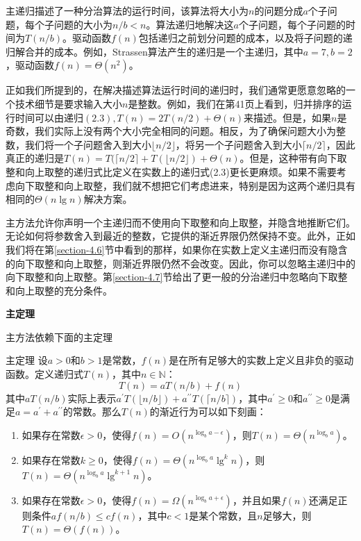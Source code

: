 \documentclass[lang=cn,newtx,10pt,scheme=chinese]{elegantbook}
\begin{document}
主递归描述了一种分治算法的运行时间，该算法将大小为$n$的问题分成$a$个子问题，每个子问题的大小为$n / b<n$。算法递归地解决这$a$个子问题，每个子问题的时间为$T(n / b)$。驱动函数$f(n)$包括递归之前划分问题的成本，以及将子问题的递归解合并的成本。例如，Strassen算法产生的递归是一个主递归，其中$a=7, b=2$，驱动函数$f(n)=\Theta\left(n^2\right)$。

正如我们所提到的，在解决描述算法运行时间的递归时，我们通常更愿意忽略的一个技术细节是要求输入大小$n$是整数。例如，我们在第41页上看到，归并排序的运行时间可以由递归$(2.3), T(n)=2 T(n / 2)+\Theta(n)$来描述。但是，如果$n$是奇数，我们实际上没有两个大小完全相同的问题。相反，为了确保问题大小为整数，我们将一个子问题舍入到大小$\lfloor n / 2\rfloor$，将另一个子问题舍入到大小$\lceil n / 2\rceil$，因此真正的递归是$T(n)=T(\lceil n / 2\rceil+T(\lfloor n / 2\rfloor)+\Theta(n)$。但是，这种带有向下取整和向上取整的递归式比定义在实数上的递归式(2.3)更长更麻烦。如果不需要考虑向下取整和向上取整，我们就不想把它们考虑进来，特别是因为这两个递归具有相同的$\Theta(n \lg n)$解决方案。

主方法允许你声明一个主递归而不使用向下取整和向上取整，并隐含地推断它们。无论如何将参数舍入到最近的整数，它提供的渐近界限仍然保持不变。此外，正如我们将在第\ref{section-4.6}节中看到的那样，如果你在实数上定义主递归而没有隐含的向下取整和向上取整，则渐近界限仍然不会改变。因此，你可以忽略主递归中的向下取整和向上取整。第\ref{section-4.7}节给出了更一般的分治递归中忽略向下取整和向上取整的充分条件。

\textbf{主定理}

主方法依赖下面的主定理

\begin{theorem}{主定理}{}
设$a>0$和$b>1$是常数，$f(n)$是在所有足够大的实数上定义且非负的驱动函数。定义递归式$T(n)$，其中$n \in \mathbb{N}$：
$$
T(n)=a T(n / b)+f(n)
$$
其中$a T(n / b)$实际上表示$a^{\prime} T(\lfloor n / b\rfloor)+a^{\prime \prime} T(\lceil n / b\rceil)$，其中$a^{\prime} \geq 0$和$a^{\prime \prime} \geq 0$是满足$a=a^{\prime}+a^{\prime \prime}$的常数。那么$T(n)$的渐近行为可以如下刻画：
\begin{enumerate}
\item 如果存在常数$\epsilon>0$，使得$f(n)=O\left(n^{\log _b a-\epsilon}\right)$，则$T(n)=\Theta\left(n^{\log _b a}\right)$。
\item 如果存在常数$k \geq 0$，使得$f(n)=\Theta\left(n^{\log _b a} \lg ^k n\right)$，则$T(n)=\Theta\left(n^{\log _b a} \lg ^{k+1} n\right)$。
\item 如果存在常数$\epsilon>0$，使得$f(n)=\Omega\left(n^{\log _b a+\epsilon}\right)$，并且如果$f(n)$还满足正则条件$a f(n / b) \leq c f(n)$，其中$c<1$是某个常数，且$n$足够大，则$T(n)=\Theta(f(n))$。
\end{enumerate}
\end{theorem}
\end{document}
